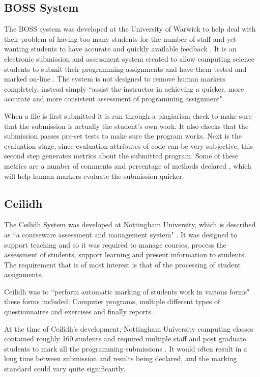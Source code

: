 \documentclass[11pt]{report}
\begin{document}
\subsection{BOSS System}
The BOSS system  was developed at the University of Warwick to help deal with their problem of having too many students for the number of staff and yet wanting students to have accurate and quickly available feedback \cite{joy_boss_2005-5}.
It is an electronic submission and assessment system created to allow computing science students to submit their programming assignments and have them tested and marked on-line \cite{joy_effective_1998-1}. The system is not designed to remove human markers completely, instead simply ``assist the instructor in achieving a quicker, more accurate and more consistent assessment of programming assignment"\cite{joy_boss_2005-5}.

When a file is first submitted it is run through a plagiarism check to make sure that the submission is actually the student’s own work. It also checks that the submission passes pre-set tests to make sure the program works. Next is the evaluation stage, since evaluation attributes of code can be very subjective, this second step generates metrics about the submitted program. Some of these metrics are a number of comments and percentage of methods declared \cite{joy_effective_1998-1}, which will help human markers evaluate the submission quicker.


\subsection{Ceilidh}

The Ceilidh System was developed at Nottingham University, which is described as ``a courseware assessment and management system" \cite{benford_ceilidh:_????}. It was designed to support teaching and so it was required to manage courses, process the assessment of students, support learning and present information to students. The requirement that is of most interest is that of the processing of student assignments.

Ceilidh was to ``perform automatic marking of students work in various forms" \cite{benford_ceilidh_1995} these forms included: Computer programs, multiple different types of questionnaires and exercises and finally reports. 

At the time of Ceilidh's development, Nottingham University computing classes contained roughly 160 students and required multiple staff and post graduate students to mark all the programming submissions \cite{benford_ceilidh_1995}. It would often result in a long time between submission and results being declared, and the marking standard could vary quite significantly.
\end{document}
